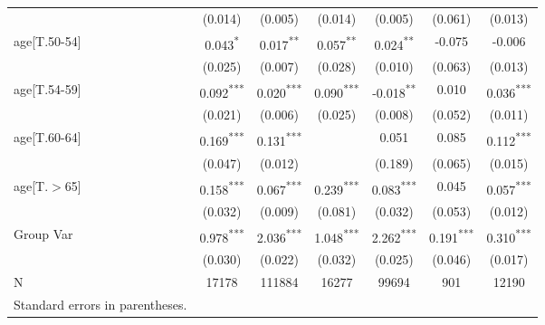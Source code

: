 \begin{table}[h!]
\begin{center}
\begin{tabular}{lcccccc}
 & (0.014) & (0.005) & (0.014) & (0.005) & (0.061) & (0.013) \\
age[T.50-54] & \cellcolor{green!25}0.043\textsuperscript{*} & \cellcolor{green!25}0.017\textsuperscript{**} & \cellcolor{green!25}0.057\textsuperscript{**} & \cellcolor{green!25}0.024\textsuperscript{**} & -0.075 & -0.006 \\
 & (0.025) & (0.007) & (0.028) & (0.010) & (0.063) & (0.013) \\
age[T.54-59] & \cellcolor{green!25}0.092\textsuperscript{***} & \cellcolor{green!25}0.020\textsuperscript{***} & \cellcolor{green!25}0.090\textsuperscript{***} & \cellcolor{red!25}-0.018\textsuperscript{**} & 0.010 & \cellcolor{green!25}0.036\textsuperscript{***} \\
 & (0.021) & (0.006) & (0.025) & (0.008) & (0.052) & (0.011) \\
age[T.60-64] & \cellcolor{green!25}0.169\textsuperscript{***} & \cellcolor{green!25}0.131\textsuperscript{***} & & 0.051 & 0.085 & \cellcolor{green!25}0.112\textsuperscript{***} \\
 & (0.047) & (0.012) & & (0.189) & (0.065) & (0.015) \\
age[T.$>$65] & \cellcolor{green!25}0.158\textsuperscript{***} & \cellcolor{green!25}0.067\textsuperscript{***} & \cellcolor{green!25}0.239\textsuperscript{***} & \cellcolor{green!25}0.083\textsuperscript{***} & 0.045 & \cellcolor{green!25}0.057\textsuperscript{***} \\
 & (0.032) & (0.009) & (0.081) & (0.032) & (0.053) & (0.012) \\
Group Var & 0.978\textsuperscript{***} & 2.036\textsuperscript{***} & 1.048\textsuperscript{***} & 2.262\textsuperscript{***} & 0.191\textsuperscript{***} & 0.310\textsuperscript{***} \\
 & (0.030) & (0.022) & (0.032) & (0.025) & (0.046) & (0.017) \\
N & 17178 & 111884 & 16277 & 99694 & 901 & 12190 \\
\hline
Standard errors in parentheses.
\end{tabular}
\end{center}
\end{table}
\bigskip


